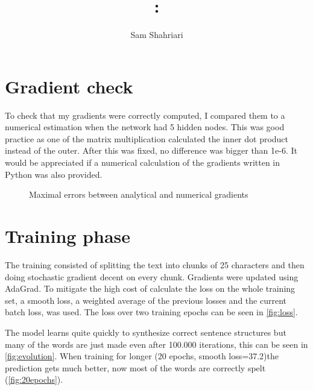 \documentclass[12pt, a4paper]{article}
\author{Sam Shahriari}
\title{\course: \assignment}
\begin{document}
\maketitle
\section{Gradient check}
To check that my gradients were correctly computed, I compared them to a numerical estimation when the network had 5 hidden nodes. This was good practice as one of the matrix multiplication calculated the inner dot product instead of the outer. After this was fixed, no difference was bigger than 1e-6. It would be appreciated if a numerical calculation of the gradients written in Python was also provided.

\begin{figure}[H]
    \centering
    \label{fig:gradient}
    \caption{Maximal errors between analytical and numerical gradients }
\end{figure}

\section{Training phase}
The training consisted of splitting the text into chunks of 25 characters and then doing stochastic gradient decent on every chunk. Gradients were updated using AdaGrad. To mitigate the high cost of calculate the loss on the whole training set, a smooth loss, a weighted average of the previous losses and the current batch loss, was used. The loss over two training epochs can be seen in \autoref{fig:loss}.

The model learns quite quickly to synthesize correct sentence structures but many of the words are just made even after 100.000 iterations, this can be seen in \autoref{fig:evolution}. When training for longer (20 epochs, smooth loss=37.2)the prediction gets much better, now most of the words are correctly spelt (\autoref{fig:20epochs}).
\end{document}
